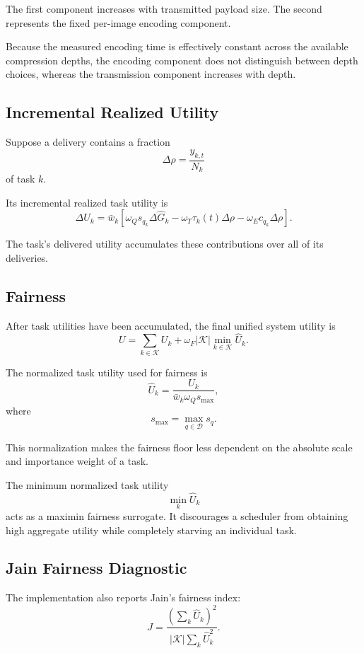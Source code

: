 \documentclass[11pt]{article}
\begin{document}
The first component increases with transmitted payload size. The second
represents the fixed per-image encoding component.

Because the measured encoding time is effectively constant across the
available compression depths, the encoding component does not distinguish
between depth choices, whereas the transmission component increases with
depth.


\subsection{Incremental Realized Utility}

Suppose a delivery contains a fraction
\[
\Delta\rho=\frac{y_{k,t}}{N_k}
\]
of task $k$.

Its incremental realized task utility is
\[
\Delta U_k
=
\bar{w}_k
\left[
\omega_Qs_{q_k}\Delta\widehat{G}_k
-
\omega_T\tau_k(t)\Delta\rho
-
\omega_Ec_{q_k}\Delta\rho
\right].
\]

The task's delivered utility accumulates these contributions over all of its
deliveries.


\subsection{Fairness}

After task utilities have been accumulated, the final unified system utility
is
\[
U
=
\sum_{k\in\mathcal{K}}U_k
+
\omega_F|\mathcal{K}|
\min_{k\in\mathcal{K}}\widehat{U}_k.
\]

The normalized task utility used for fairness is
\[
\widehat{U}_k
=
\frac{U_k}
{\bar{w}_k\omega_Qs_{\max}},
\]
where
\[
s_{\max}
=
\max_{q\in\mathcal{D}}s_q.
\]

This normalization makes the fairness floor less dependent on the absolute
scale and importance weight of a task.

The minimum normalized task utility
\[
\min_k\widehat{U}_k
\]
acts as a maximin fairness surrogate. It discourages a scheduler from
obtaining high aggregate utility while completely starving an individual
task.


\subsection{Jain Fairness Diagnostic}

The implementation also reports Jain's fairness index:
\[
J
=
\frac{
\left(\sum_k\widehat{U}_k\right)^2
}{
|\mathcal{K}|
\sum_k\widehat{U}_k^2
}.
\]
\end{document}
